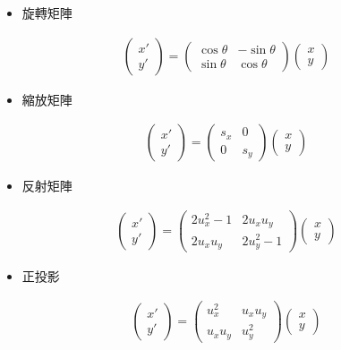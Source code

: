 
\begin{itemize}
    \item 旋轉矩陣
\end{itemize}
\begin{align}
    \begin{pmatrix}
        x' \\ y' 
    \end{pmatrix} = 
    \begin{pmatrix} 
        \cos \theta & -\sin\theta \\
        \sin \theta & \cos \theta 
    \end{pmatrix} 
    \begin{pmatrix} 
        x \\ y 
    \end{pmatrix}
\end{align}


\begin{itemize}
    \item 縮放矩陣
\end{itemize}
\begin{align}
    \begin{pmatrix} x' \\ y' \end{pmatrix} = \begin{pmatrix} s_x & 0 \\ 0 & s_y \end{pmatrix} \begin{pmatrix} x \\ y \end{pmatrix}
\end{align}


\begin{itemize}
    \item 反射矩陣
\end{itemize}
\begin{align}
    \begin{pmatrix} x' \\ y' \end{pmatrix} = \begin{pmatrix} 2 u_x^2 - 1 & 2 u_x u_y \\ 2 u_x u_y & 2 u_y^2 - 1 \end{pmatrix} \begin{pmatrix} x \\ y \end{pmatrix}
\end{align}


\begin{itemize}
    \item 正投影
\end{itemize}
\begin{align}
    \begin{pmatrix} x' \\ y' \end{pmatrix} = \begin{pmatrix} u_x^2 & u_x u_y \\ u_x u_y & u_y^2 \end{pmatrix} \begin{pmatrix} x \\ y \end{pmatrix}
\end{align}